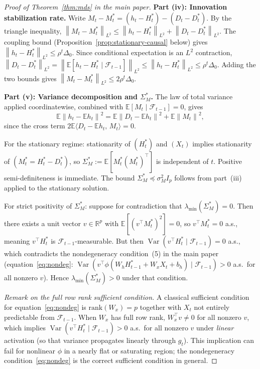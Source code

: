\documentclass[bj,authoryear]{imsart}
\theoremstyle{plain}
\theoremstyle{definition}
\newcommand{\E}{\mathbb{E}}
\newcommand{\R}{\mathbb{R}}
\newcommand{\F}{\mathcal{F}}
\newcommand{\norm}[1]{\left\lVert #1 \right\rVert}
\newcommand{\given}{\mid}
\DeclareMathOperator{\Var}{Var}
\begin{document}
\begin{proof}[Proof of Theorem~\ref{thm:mds} in the main paper]
  \textbf{Part (iv): Innovation stabilization rate.}
  Write $M_t - M_t^* = (h_t - H_t^*) - (D_t - D_t^*)$.
  By the triangle inequality,
  $\norm{M_t - M_t^*}_{L^2}
  \leq \norm{h_t - H_t^*}_{L^2} + \norm{D_t - D_t^*}_{L^2}$.
  The coupling bound (Proposition~\ref{prop:stationary-causal} below) gives
  $\norm{h_t - H_t^*}_{L^2} \leq \rho^t\Delta_0$.
  Since conditional expectation is an $L^2$ contraction,
  $\norm{D_t - D_t^*}_{L^2}
  = \norm{\E[h_t - H_t^*\mid\F_{t-1}]}_{L^2}
  \leq \norm{h_t - H_t^*}_{L^2}
  \leq \rho^t\Delta_0$.
  Adding the two bounds gives $\norm{M_t - M_t^*}_{L^2} \leq 2\rho^t\Delta_0$.

  \textbf{Part (v): Variance decomposition and $\Sigma_M^*$.}
  The law of total variance applied coordinatewise, combined with
  $\E[M_t\given\F_{t-1}] = 0$, gives
  \[
    \E\norm{h_t - \E h_t}^2
    = \E\norm{D_t - \E h_t}^2 + \E\norm{M_t}^2,
  \]
  since the cross term $2\E\langle D_t - \E h_t,\, M_t\rangle = 0$.

  For the stationary regime: stationarity of $(H_t^*)$ and $(X_t)$ implies
  stationarity of $(M_t^* = H_t^* - D_t^*)$, so
  $\Sigma_M^* := \E[M_t^*(M_t^*)^\top]$ is independent of $t$.
  Positive semi-definiteness is immediate.  The bound
  $\Sigma_M^* \preceq \sigma_M^2 I_p$ follows from part~(iii) applied to the
  stationary solution.

  For strict positivity of $\Sigma_M^*$: suppose for contradiction that
  $\lambda_{\min}(\Sigma_M^*) = 0$.  Then there exists a unit vector
  $v\in\R^p$ with $\E[(v^\top M_t^*)^2] = 0$, so $v^\top M_t^* = 0$ a.s.,
  meaning $v^\top H_t^*$ is $\F_{t-1}$-measurable.  But then
  $\Var(v^\top H_t^*\mid\F_{t-1}) = 0$ a.s., which contradicts the
  nondegeneracy condition~(5) in the main paper
  (equation~\eqref{eq:nondeg}: $\Var(v^\top\phi(W_hH_{t-1}^*+W_xX_t+b_h)\mid\F_{t-1})>0$
  a.s.\ for all nonzero $v$).
  Hence $\lambda_{\min}(\Sigma_M^*)>0$ under that condition.

  \emph{Remark on the full row rank sufficient condition.}
  A classical sufficient condition for equation~\eqref{eq:nondeg} is
  $\mathrm{rank}(W_x)=p$ together with $X_t$ not entirely predictable
  from $\F_{t-1}$.  When $W_x$ has full row rank,
  $W_x^\top v\neq0$ for all nonzero $v$, which implies
  $\Var(v^\top H_t^*\mid\F_{t-1})>0$ a.s.\ for all nonzero $v$ under \emph{linear} activation (so that variance propagates linearly through $g_t$).
  This implication can fail for nonlinear $\phi$ in a nearly flat or saturating region; the nondegeneracy condition~\eqref{eq:nondeg}
  is the correct sufficient condition in general.
\end{proof}
\end{document}
